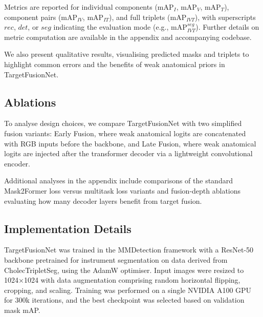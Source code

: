 \documentclass[pdflatex,sn-mathphys-num]{sn-jnl}%
\newcommand{\mAP}{\textrm{mAP}}
\theoremstyle{thmstyleone}%
\theoremstyle{thmstyletwo}%
\theoremstyle{thmstylethree}%
\begin{document}
Metrics are reported for individual components ($\mAP_I$, $\mAP_V$, $\mAP_T$), component pairs ($\mAP_{IV}$, $\mAP_{IT}$), and full triplets ($\mAP_{IVT}$), with superscripts $rec$, $det$, or $seg$ indicating the evaluation mode (e.g., $\mAP_{IVT}^{seg}$). Further details on metric computation are available in the appendix and accompanying codebase.  

We also present qualitative results, visualising predicted masks and triplets to highlight common errors and the benefits of weak anatomical priors in TargetFusionNet.


\subsection{Ablations}
To analyse design choices, we compare TargetFusionNet with two simplified fusion variants:  
Early Fusion, where weak anatomical logits are concatenated with RGB inputs before the backbone, and  
Late Fusion, where weak anatomical logits are injected after the transformer decoder via a lightweight convolutional encoder.  

Additional analyses in the appendix include comparisons of the standard Mask2Former loss versus multitask loss variants and fusion-depth ablations evaluating how many decoder layers benefit from target fusion.

\subsection{Implementation Details}
TargetFusionNet was trained in the MMDetection framework with a ResNet-50 backbone pretrained for instrument segmentation on data derived from CholecTripletSeg, using the AdamW optimiser. Input images were resized to 1024×1024 with data augmentation comprising random horizontal flipping, cropping, and scaling. Training was performed on a single NVIDIA A100 GPU for 300k iterations, and the best checkpoint was selected based on validation mask mAP. 
\end{document}
